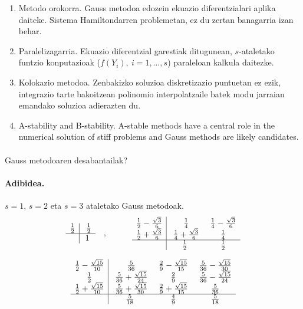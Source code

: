 \begin{enumerate}
\item{Metodo orokorra.}
Gauss metodoa edozein ekuazio diferentzialari aplika daiteke. Sistema Hamiltondarren problemetan, ez du zertan banagarria izan behar.

\item{Paralelizagarria.}
Ekuazio diferentzial garestiak ditugunean, $s$-ataletako funtzio konputazioak ($f(Y_i), \ i=1,\dots,s$) paraleloan kalkula daitezke.  

\item{Kolokazio metodoa.}
Zenbakizko soluzioa diskretizazio puntuetan ez ezik, integrazio tarte bakoitzean polinomio interpolatzaile batek modu jarraian emandako soluzioa adierazten du.

\item{A-stability and B-stability.}
A-stable methods have a central role in the numerical solution of stiff problems and Gauss methods are likely candidates.
  
\end{enumerate}


\paragraph*{} Gauss metodoaren desabantailak?


\paragraph{\textbf{Adibidea}.} $s=1$, $s=2$ eta $s=3$ ataletako Gauss metodoak.
\begin{equation*}
\begin{array}{c|c}
  \frac{1}{2} & \ \frac{1}{2} \\
  \hline
   & 1 \\
\end{array} \ \ \ ,  \ \ \ \ \ \ \ \ \
\begin{array}{c|c c}
  \frac{1}{2}-\frac{\sqrt{3}}{6} & \ \frac{1}{4} & \ \frac{1}{4}-\frac{\sqrt{3}}{6} \\
  \frac{1}{2}+\frac{\sqrt{3}}{6} & \ \frac{1}{4}+\frac{\sqrt{3}}{6} & \ \frac{1}{4} \\
  \hline
         &  \frac{1}{2} & \ \frac{1}{2} \\
\end{array}
\end{equation*}

\begin{equation*}
\begin{array}{c|c c c}
  \frac{1}{2}-\frac{\sqrt{15}}{10} & \ \frac{5}{36} & \ \frac{2}{9}-\frac{\sqrt{15}}{15} & \ \frac{5}{36}-\frac{\sqrt{15}}{30} \\
  \frac{1}{2}   & \ \frac{5}{36}+\frac{\sqrt{15}}{24} & \ \frac{2}{9} & \ \frac{5}{36}-\frac{\sqrt{15}}{24} \\
  \frac{1}{2}+\frac{\sqrt{15}}{10}   & \ \frac{5}{36}+\frac{\sqrt{15}}{30} & \ \frac{2}{9}+\frac{\sqrt{15}}{15} & \ \frac{5}{36} \\
  \hline
  & \frac{5}{18} & \ \frac{4}{9} & \ \frac{5}{18}
\end{array}
\end{equation*}
      


